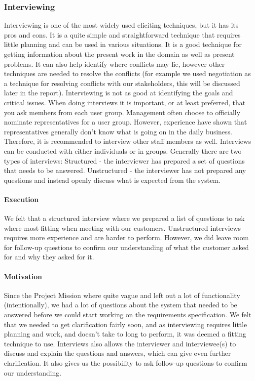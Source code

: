 \documentclass[10pt]{article}
\begin{document}
\subsubsection{Interviewing}
Interviewing is one of the most widely used eliciting techniques, but it has its pros and cons. It is a quite simple and straightforward technique that requires little planning and can be used in various situations. It is a good technique for getting information about the present work in the domain as well as present problems. It can also help identify where conflicts may lie, however other techniques are needed to resolve the conflicts (for example we used negotiation as a technique for resolving conflicts with our stakeholders, this will be discussed later in the report). Interviewing is not as good at identifying the goals and critical issues.
When doing interviews it is important, or at least preferred, that you ask members from each user group. Management often choose to officially nominate representatives for a user group. However, experience have shown that representatives generally don’t know what is going on in the daily business. Therefore, it is recommended to interview other staff members as well. Interviews can be conducted with either individuals or in groups.
Generally there are two types of interviews: 
Structured -  the interviewer has prepared a set of questions that needs to be answered. 
Unstructured - the interviewer has not prepared any questions and instead openly discuss what is expected from the system. 
\paragraph{Execution}
We felt that a structured interview where we prepared a list of questions to ask where most fitting when meeting with our customers. Unstructured interviews requires more experience and are harder to perform. However, we did leave room for follow-up questions to confirm our understanding of what the customer asked for and why they asked for it. 
\paragraph{Motivation}
Since the Project Mission where quite vague and left out a lot of functionality (intentionally), we had a lot of questions about the system that needed to be answered before we could start working on the requirements specification. We felt that we needed to get clarification fairly soon, and as interviewing requires little planning and work, and doesn’t take to long to perform, it was deemed a fitting technique to use. Interviews also allows the interviewer and interviewee(s) to discuss and explain the questions and answers, which can give even further clarification. It also gives us the possibility to ask follow-up questions to confirm our understanding. 
\end{document}
